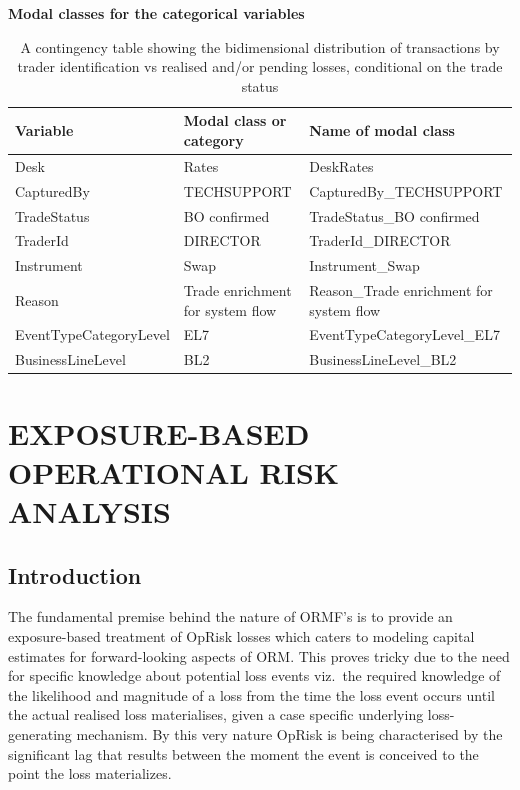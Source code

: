 \documentclass{DissertateUSU}
\begin{document}
\begin{table}[htbp]
        \centering
        \textbf{Modal classes for the categorical variables} 
\singlespacing        
        \small
        \setlength\tabcolsep{2pt}
            \begin{tabular}{|l|l|p{6cm}|} \hline
            Variable & Modal class or category & Name of modal class \\\hline
            Desk & Rates & DeskRates \\ \cline{1-3}
            CapturedBy & TECHSUPPORT & CapturedBy\_TECHSUPPORT \\ \cline{1-3}
            TradeStatus & BO confirmed & TradeStatus\_BO confirmed \\ \cline{1-3}
            TraderId & DIRECTOR & TraderId\_DIRECTOR \\ \cline{1-3}
            Instrument & Swap & Instrument\_Swap \\ \cline{1-3}
            Reason & Trade enrichment for system flow  & Reason\_Trade enrichment for system flow \\ \cline{1-3}
            EventTypeCategoryLevel & EL7 & EventTypeCategoryLevel\_EL7 \\ \cline{1-3}
            BusinessLineLevel & BL2 & BusinessLineLevel\_BL2 \\ \cline{1-3} 
            \end{tabular}
            \caption{A contingency table showing the bidimensional distribution of transactions by trader identification vs realised and/or pending losses, conditional on the trade status}
            \label{tab:Mosaic_Contingency}
\end{table}
\doublespacing

\singlespacing

\FloatBarrier
\newpage
{}
\fancyhead[R]{\thepage}
\fancyfoot[C]{}

\chapter{EXPOSURE-BASED OPERATIONAL RISK ANALYSIS}
\label{EXPOSURE-BASED OPERATIONAL RISK ANALYSIS}

\doublespacing

\section{Introduction}
\label{sec3:Introduction}

The fundamental premise behind the nature of ORMF's is to provide an
exposure-based treatment of OpRisk losses which caters to modeling
capital estimates for forward-looking aspects of ORM. This proves tricky
due to the need for specific knowledge about potential loss events
viz.~the required knowledge of the likelihood and magnitude of a loss
from the time the loss event occurs until the actual realised loss
materialises, given a case specific underlying loss-generating
mechanism. By this very nature OpRisk is being characterised by the
significant lag that results between the moment the event is conceived
to the point the loss materializes.\medskip 
\end{document}
